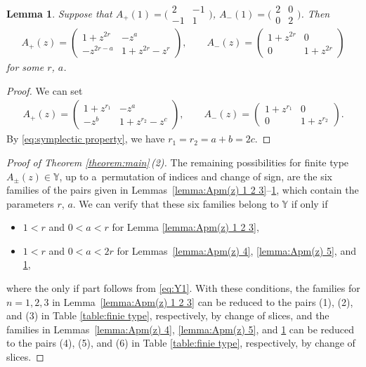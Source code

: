 \documentclass[pdftex]{sigma}
\numberwithin{equation}{section}
\newtheorem{Lemma}[Theorem]{Lemma}
\theoremstyle{definition}
\begin{document}
\begin{Lemma}\label{lemma:Apm(z) 6}
 Suppose that
$
 A_{+}(1) =
 \bigl( \begin{smallmatrix}
 2 & - 1 \\
 -1 & 1
 \end{smallmatrix}\bigr)$, $
 A_{-}(1) =
 \bigl( \begin{smallmatrix}
 2 & 0 \\
 0 & 2
 \end{smallmatrix}\bigr)$.
 Then
 \begin{align*}
 A_{+}(z) =
 \begin{pmatrix}
 1+z^{2r} & - z^a \\
 -z^{2r-a} & 1+z^{2r}-z^r
 \end{pmatrix},\qquad
 A_{-}(z) =
 \begin{pmatrix}
 1+z^{2r} & 0 \\
 0 & 1+z^{2r}
 \end{pmatrix}
 \end{align*}
 for some $r$, $a$.
\end{Lemma}
\begin{proof}
 We can set
 \begin{align*}
 A_{+}(z) =
 \begin{pmatrix}
 1+z^{r_1} & - z^a \\
 -z^{b} & 1+z^{r_2}-z^c
 \end{pmatrix},\qquad
 A_{-}(z) =
 \begin{pmatrix}
 1+z^{r_1} & 0 \\
 0 & 1+z^{r_2}
 \end{pmatrix}.
 \end{align*}
 By \eqref{eq:symplectic property},
 we have $r_1=r_2=a+b=2c$.
\end{proof}

\begin{proof}[Proof of Theorem \ref{theorem:main}\,(2)]
The remaining possibilities for
finite type $A_\pm (z) \in \mathbb{Y}$,
up to a~permutation of indices and change of sign,
are the six families of the pairs
given in Lemmas~\ref{lemma:Apm(z) 1 2 3}--\ref{lemma:Apm(z) 6}, which contain the parameters $r$, $a$.
We can verify that these six families belong to $\mathbb{Y}$
if only if
\begin{itemize}\itemsep=0pt
 \item $1 < r$ and $0 < a < r$ for Lemma \ref{lemma:Apm(z) 1 2 3},
 \item $1 < r$ and $0 < a < 2r$ for Lemmas~\ref{lemma:Apm(z) 4}, \ref{lemma:Apm(z) 5}, and \ref{lemma:Apm(z) 6},
\end{itemize}
where the only if part follows from \eqref{eq:Y1}.
With these conditions,
the families for $n = 1, 2, 3$ in Lemma~\ref{lemma:Apm(z) 1 2 3}
can be reduced to the pairs (1), (2), and (3) in Table \ref{table:finie type}, respectively,
by change of slices,
and the families in Lemmas~\ref{lemma:Apm(z) 4}, \ref{lemma:Apm(z) 5}, and \ref{lemma:Apm(z) 6}
can be reduced to the pairs (4), (5), and (6) in Table \ref{table:finie type}, respectively,
by change of slices.
\end{proof}
\end{document}
